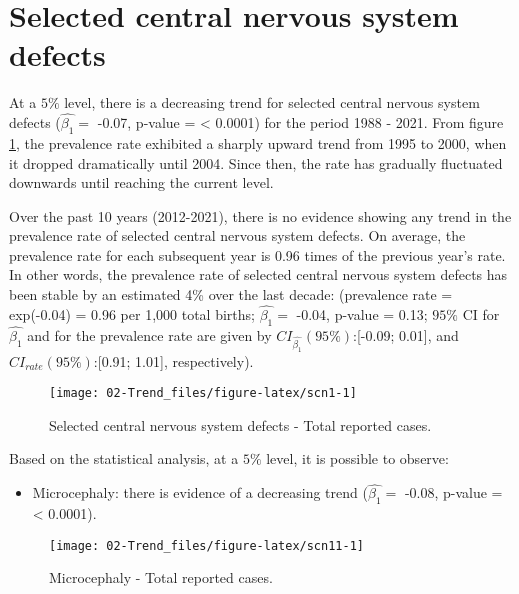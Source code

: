 \documentclass[
]{krantz}
\providecommand{\tightlist}{%
  \setlength{\itemsep}{0pt}\setlength{\parskip}{0pt}}
\begin{document}
\clearpage

\hypertarget{section33}{%
\section{Selected central nervous system defects}\label{section33}}

At a \(5\%\) level, there is a decreasing trend for selected central nervous system defects (\(\hat{\beta_{1}} =\) -0.07, p-value = \textless{} 0.0001) for the period 1988 - 2021. From figure \ref{fig:scn1}, the prevalence rate exhibited a sharply upward trend from 1995 to 2000, when it dropped dramatically until 2004. Since then, the rate has gradually fluctuated downwards until reaching the current level.

Over the past 10 years (2012-2021), there is no evidence showing any trend in the prevalence rate of selected central nervous system defects. On average, the prevalence rate for each subsequent year is 0.96 times of the previous year's rate. In other words, the prevalence rate of selected central nervous system defects has been stable by an estimated 4\% over the last decade: (prevalence rate = exp(-0.04) = 0.96 per 1,000 total births; \(\hat{\beta_{1}} =\) -0.04, p-value = 0.13; \(95\%\) CI for \(\hat{\beta_{1}}\) and for the prevalence rate are given by \(CI_{\hat{\beta_{1}}}(95\%)\):{[}-0.09; 0.01{]}, and \(CI_{rate}(95\%)\):{[}0.91; 1.01{]}, respectively).

\begin{figure}[h]

{\centering \texttt{[image: 02-Trend\_files/figure-latex/scn1-1]} 

}

\caption{Selected central nervous system defects - Total reported cases.}\label{fig:scn1}
\end{figure}

Based on the statistical analysis, at a \(5\%\) level, it is possible to observe:

\begin{itemize}
\tightlist
\item
  Microcephaly: there is evidence of a decreasing trend (\(\hat{\beta_{1}} =\) -0.08, p-value = \textless{} 0.0001).
\end{itemize}

\begin{figure}[h]

{\centering \texttt{[image: 02-Trend\_files/figure-latex/scn11-1]} 

}

\caption{Microcephaly - Total reported cases.}\label{fig:scn11}
\end{figure}
\end{document}
